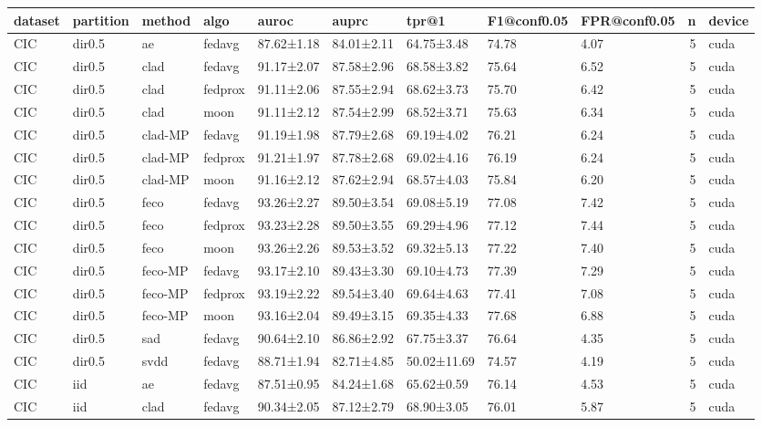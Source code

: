 \begin{tabular}{lllllllllrl}
\toprule
dataset & partition & method & algo & auroc & auprc & tpr@1 & F1@conf0.05 & FPR@conf0.05 & n & device \\
\midrule
CIC & dir0.5 & ae & fedavg & 87.62±1.18 & 84.01±2.11 & 64.75±3.48 & 74.78 & 4.07 & 5 & cuda \\
CIC & dir0.5 & clad & fedavg & 91.17±2.07 & 87.58±2.96 & 68.58±3.82 & 75.64 & 6.52 & 5 & cuda \\
CIC & dir0.5 & clad & fedprox & 91.11±2.06 & 87.55±2.94 & 68.62±3.73 & 75.70 & 6.42 & 5 & cuda \\
CIC & dir0.5 & clad & moon & 91.11±2.12 & 87.54±2.99 & 68.52±3.71 & 75.63 & 6.34 & 5 & cuda \\
CIC & dir0.5 & clad-MP & fedavg & 91.19±1.98 & 87.79±2.68 & 69.19±4.02 & 76.21 & 6.24 & 5 & cuda \\
CIC & dir0.5 & clad-MP & fedprox & 91.21±1.97 & 87.78±2.68 & 69.02±4.16 & 76.19 & 6.24 & 5 & cuda \\
CIC & dir0.5 & clad-MP & moon & 91.16±2.12 & 87.62±2.94 & 68.57±4.03 & 75.84 & 6.20 & 5 & cuda \\
CIC & dir0.5 & feco & fedavg & 93.26±2.27 & 89.50±3.54 & 69.08±5.19 & 77.08 & 7.42 & 5 & cuda \\
CIC & dir0.5 & feco & fedprox & 93.23±2.28 & 89.50±3.55 & 69.29±4.96 & 77.12 & 7.44 & 5 & cuda \\
CIC & dir0.5 & feco & moon & 93.26±2.26 & 89.53±3.52 & 69.32±5.13 & 77.22 & 7.40 & 5 & cuda \\
CIC & dir0.5 & feco-MP & fedavg & 93.17±2.10 & 89.43±3.30 & 69.10±4.73 & 77.39 & 7.29 & 5 & cuda \\
CIC & dir0.5 & feco-MP & fedprox & 93.19±2.22 & 89.54±3.40 & 69.64±4.63 & 77.41 & 7.08 & 5 & cuda \\
CIC & dir0.5 & feco-MP & moon & 93.16±2.04 & 89.49±3.15 & 69.35±4.33 & 77.68 & 6.88 & 5 & cuda \\
CIC & dir0.5 & sad & fedavg & 90.64±2.10 & 86.86±2.92 & 67.75±3.37 & 76.64 & 4.35 & 5 & cuda \\
CIC & dir0.5 & svdd & fedavg & 88.71±1.94 & 82.71±4.85 & 50.02±11.69 & 74.57 & 4.19 & 5 & cuda \\
CIC & iid & ae & fedavg & 87.51±0.95 & 84.24±1.68 & 65.62±0.59 & 76.14 & 4.53 & 5 & cuda \\
CIC & iid & clad & fedavg & 90.34±2.05 & 87.12±2.79 & 68.90±3.05 & 76.01 & 5.87 & 5 & cuda \\

\end{tabular}
